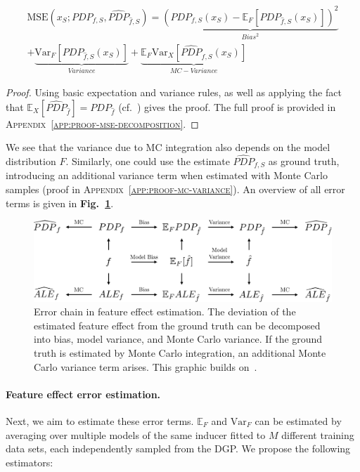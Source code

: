 \documentclass[runningheads]{llncs}
\begin{document}
\begin{equation}
    \begin{split}
        \text{MSE}(x_S; PDP_{f,S}, \widehat{PDP}_{\hat f,S})
        = \underbrace{{(PDP_{f,S}(x_S) - \mathbb{E}_F[PDP_{\hat{f}, S}(x_S)])}^2}_{Bias^2} \\
        + \underbrace{\text{Var}_F[PDP_{\hat{f},S}(x_S)]}_{Variance} + \underbrace{\mathbb{E}_F\text{Var}_{X}[\widehat{PDP}_{\hat{f},S}(x_S)]}_{MC-Variance}
    \end{split}
    \label{eq:mse-decomposition}
\end{equation}

\begin{proof}
    Using basic expectation and variance rules, as well as applying the fact that
    $\mathbb{E}_X[\widehat{PDP}_{\hat f}] = PDP_{\hat f}$ (cf.~\cite{molnar_relating_2023})
    gives the proof. The full proof is provided in
    \textsc{Appendix~\ref{app:proof-mse-decomposition}}.
\end{proof}

\noindent We see that the variance due to MC integration also depends on the model
distribution $F$. Similarly, one could use the estimate $\widehat{PDP}_{f,S}$
as ground truth, introducing an additional variance term when
estimated with Monte Carlo samples (proof in
\textsc{Appendix~\ref{app:proof-mc-variance}}).
An overview of all error terms is given in
\textbf{Fig.\@~\ref{fig:error-graph}}.

\begin{figure}[t]
    \includegraphics[width=\textwidth]{img/error_graph.pdf}
    \caption{Error chain in feature effect estimation. The deviation of the estimated
        feature effect from the ground truth can be decomposed into bias, model variance,
        and Monte Carlo variance. If the ground truth is estimated by Monte Carlo
        integration, an additional Monte Carlo variance term arises. This graphic
        builds on~\cite{molnar_relating_2023}.}\label{fig:error-graph}
\end{figure}

\paragraph{Feature effect error estimation.} Next, we aim to estimate these error terms.
$\mathbb{E}_F$ and $\text{Var}_F$ can be estimated by averaging over
multiple models of the same inducer fitted to $M$ different training data
sets, each independently sampled from the DGP. We propose the following estimators:  %
\end{document}
